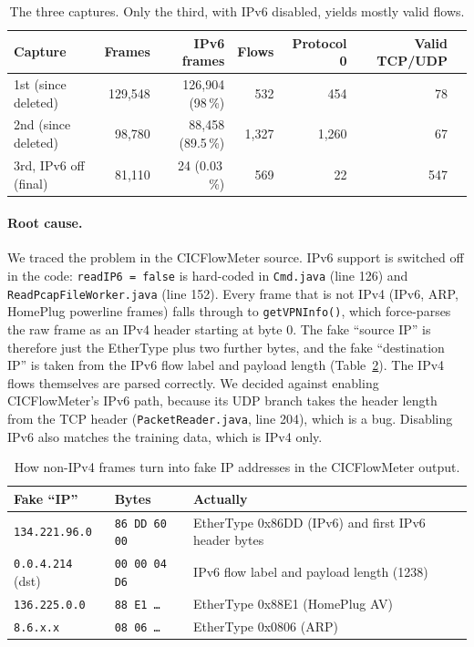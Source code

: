 \begin{table}[ht]
	\centering\small
	\begin{tabular}{lrrrrrr}
		\toprule
		Capture & Frames & IPv6 frames & Flows & Protocol 0 & Valid TCP/UDP \\
		\midrule
		1st (since deleted) & 129,548 & 126,904 (98\,\%) & 532 & 454 & 78 \\
		2nd (since deleted) & 98,780 & 88,458 (89.5\,\%) & 1,327 & 1,260 & 67 \\
		3rd, IPv6 off (final) & 81,110 & 24 (0.03\,\%) & 569 & 22 & 547 \\
		\bottomrule
	\end{tabular}
	\caption{The three captures. Only the third, with IPv6 disabled, yields mostly valid flows.}
	\label{tab:captures}
\end{table}

\paragraph{Root cause.} We traced the problem in the CICFlowMeter source. IPv6 support is switched off in the code: \texttt{readIP6 = false} is hard-coded in \texttt{Cmd.java} (line 126) and \texttt{ReadPcapFileWorker.java} (line 152). Every frame that is not IPv4 (IPv6, ARP, HomePlug powerline frames) falls through to \texttt{getVPNInfo()}, which force-parses the raw frame as an IPv4 header starting at byte 0. The fake ``source IP'' is therefore just the EtherType plus two further bytes, and the fake ``destination IP'' is taken from the IPv6 flow label and payload length (Table~\ref{tab:fakeip}). The IPv4 flows themselves are parsed correctly. We decided against enabling CICFlowMeter's IPv6 path, because its UDP branch takes the header length from the TCP header (\texttt{PacketReader.java}, line 204), which is a bug. Disabling IPv6 also matches the training data, which is IPv4 only.

\begin{table}[ht]
	\centering\small
	\begin{tabular}{llp{7.5cm}}
		\toprule
		Fake ``IP'' & Bytes & Actually \\
		\midrule
		\texttt{134.221.96.0} & \texttt{86 DD 60 00} & EtherType 0x86DD (IPv6) and first IPv6 header bytes \\
		\texttt{0.0.4.214} (dst) & \texttt{00 00 04 D6} & IPv6 flow label and payload length (1238) \\
		\texttt{136.225.0.0} & \texttt{88 E1 \ldots} & EtherType 0x88E1 (HomePlug AV) \\
		\texttt{8.6.x.x} & \texttt{08 06 \ldots} & EtherType 0x0806 (ARP) \\
		\bottomrule
	\end{tabular}
	\caption{How non-IPv4 frames turn into fake IP addresses in the CICFlowMeter output.}
	\label{tab:fakeip}
\end{table}


